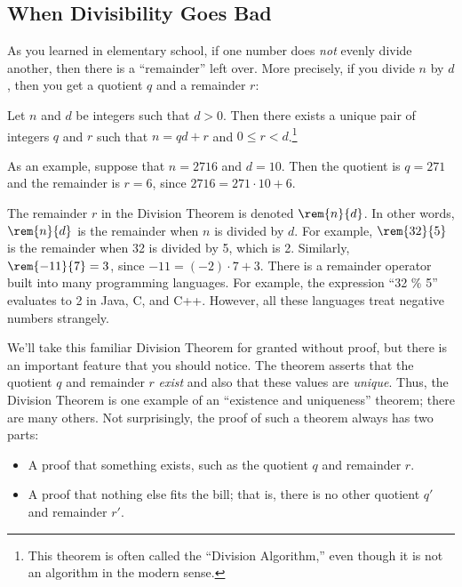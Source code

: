 \subsection{When Divisibility Goes Bad}

As you learned in elementary school, if one number does \emph{not}
evenly divide another, then there is a ``remainder'' left over.  More
precisely, if you divide $n$ by $d$, then you get a quotient $q$ and a
remainder $r$:

\begin{theorem}
Let $n$ and $d$ be integers such that $d > 0$.  Then there exists a
unique pair of integers $q$ and $r$ such that $n = qd + r$ and $0 \leq
r < d$.\footnote{This theorem is often called the ``Division Algorithm,'' even
though it is not an algorithm in the modern sense.}
\end{theorem}

As an example, suppose that $n = 2716$ and $d = 10$.  Then the
quotient is $q = 271$ and the remainder is $r = 6$, since $2716 = 271
\cdot 10 + 6$.

The remainder $r$ in the Division Theorem is denoted $\rem{n}{d}$.  In
other words, $\rem{n}{d}$ is the remainder when $n$ is divided by $d$.
For example, $\rem{32}{5}$ is the remainder when 32 is divided by 5, which
is 2.  Similarly, $\rem{-11}{7} = 3$, since $-11 = (-2) \cdot 7 + 3$.
There is a remainder operator built into many programming languages.  For
example, the expression ``32 \% 5'' evaluates to 2 in Java, C, and C++.
However, all these languages treat negative numbers strangely.

We'll take this familiar Division Theorem for granted without proof, but 
there is an important feature that you should notice.  The theorem asserts 
that the quotient $q$ and remainder $r$ \emph{exist} and also that these
values are \emph{unique}.  Thus, the Division Theorem is one example
of an ``existence and uniqueness'' theorem; there are many others.
Not surprisingly, the proof of such a theorem always has two parts:
%
\begin{itemize}
\item A proof that something exists, such as the quotient $q$ and
remainder $r$.
\item A proof that nothing else fits the bill; that is, there is no
other quotient $q'$ and remainder $r'$.
\end{itemize}
%

